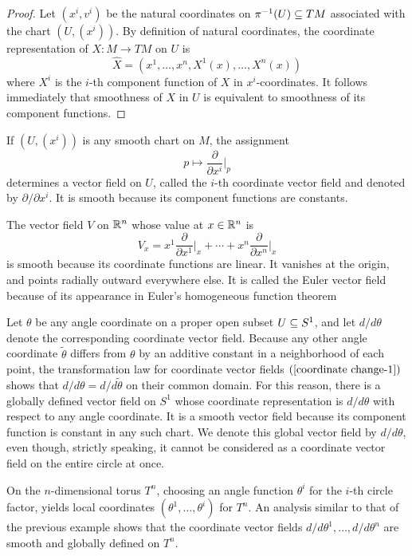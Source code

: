 \begin{proof}
Let $(x^i,v^i)$ be the natural coordinates on $\pi^{-1}(U)\subseteq TM$ associated with the chart $(U,(x^i))$. By definition of natural coordinates, the coordinate representation of $X:M\to TM$ on $U$ is
\[\widehat{X}=(x^1,\dots,x^n,X^1(x),\dots,X^n(x))\]
where $X^i$ is the $i$-th component function of $X$ in $x^i$-coordinates. It follows immediately that smoothness of $X$ in $U$ is equivalent to smoothness of its component functions.
\end{proof}
\begin{example}
If $(U,(x^i))$ is any smooth chart on $M$, the assignment
\[p\mapsto\frac{\partial}{\partial x^i}\Big|_p\]
determines a vector field on $U$, called the $i$-th coordinate vector field and denoted by $\partial/\partial x^i$. It is smooth because its component functions are constants.
\end{example}
\begin{example}\label{Euler vector field}
The vector field $V$ on $\mathbb{R}^n$ whose value at $x\in\mathbb{R}^n$ is
\[V_x=x^1\frac{\partial}{\partial x^1}\Big|_x+\cdots+x^n\frac{\partial}{\partial x^n}\Big|_x\]
is smooth because its coordinate functions are linear. It vanishes at the origin, and points radially outward everywhere else. It is called the Euler vector field because of its appearance in Euler's homogeneous function theorem
\end{example}
\begin{example}\label{angle vector field}
Let $\theta$ be any angle coordinate on a proper open subset $U\subseteq S^1$, and let $d/d\theta$ denote the corresponding coordinate vector field. Because any other angle coordinate $\widetilde{\theta}$ differs from $\theta$ by an additive constant in a neighborhood of each point, the transformation law for coordinate vector fields $(\ref{coordinate change-1})$ shows that $d/d\theta=d/d\widetilde{\theta}$ on their common domain. For this reason, there is a globally defined vector field on $S^1$ whose coordinate representation is $d/d\theta$ with respect to any angle coordinate. It is a smooth vector field because its component function is constant in any such chart. We denote this global vector field by $d/d\theta$, even though, strictly speaking, it cannot be considered as a coordinate vector field on the entire circle at once.
\end{example}
\begin{example}
On the $n$-dimensional torus $T^n$, choosing an angle function $\theta^i$ for the $i$-th circle factor, yields local coordinates $(\theta^1,\dots,\theta^i)$ for $T^n$. An analysis similar to that of the previous example shows that the coordinate vector fields $d/d\theta^1,\dots,d/d\theta^n$ are smooth and globally defined on $T^n$.
\end{example}

